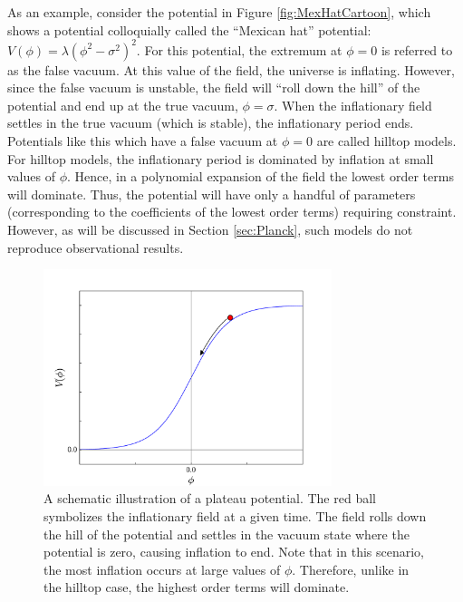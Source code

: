 \documentclass[a4paper,11pt]{article}
\begin{document}
As an example, consider the potential in Figure \ref{fig:MexHatCartoon}, which shows a potential colloquially called the ``Mexican hat'' potential: $V(\phi)=\lambda(\phi^2-\sigma^2)^2$. For this potential, the extremum at $\phi=0$ is referred to as the false vacuum. At this value of the field, the universe is inflating. However, since the false vacuum is unstable, the field will ``roll down the hill'' of the potential and end up at the true vacuum, $\phi=\sigma$. When the inflationary field settles in the true vacuum (which is stable), the inflationary period ends. Potentials like this which have a false vacuum at $\phi=0$ are called hilltop models. For hilltop models, the inflationary period is dominated by inflation at small values of $\phi$. Hence, in a polynomial expansion of the field the lowest order terms will dominate. Thus, the potential will have only a handful of parameters (corresponding to the coefficients of the lowest order terms) requiring constraint. However, as will be discussed in Section \ref{sec:Planck}, such models do not reproduce observational results.

\begin{figure}[h]
	\centering
	\includegraphics[width=0.75\textwidth]{figures/plateau_cartoon.pdf}
	\caption[Schematic illustration of a Plateau Model]{A schematic illustration of a plateau potential. The red ball symbolizes the inflationary field at a given time. The field rolls down the hill of the potential and settles in the vacuum state where the potential is zero, causing inflation to end. Note that in this scenario, the most inflation occurs at large values of $\phi$. Therefore, unlike in the hilltop case, the highest order terms will dominate.}
	\label{fig:PlateauCartoon}
\end{figure}
\end{document}
